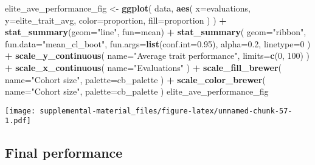 \documentclass[]{book}
\newenvironment{Shaded}{\begin{snugshade}}{\end{snugshade}}
\newcommand{\DataTypeTok}[1]{\textcolor[rgb]{0.13,0.29,0.53}{#1}}
\newcommand{\DecValTok}[1]{\textcolor[rgb]{0.00,0.00,0.81}{#1}}
\newcommand{\FloatTok}[1]{\textcolor[rgb]{0.00,0.00,0.81}{#1}}
\newcommand{\KeywordTok}[1]{\textcolor[rgb]{0.13,0.29,0.53}{\textbf{#1}}}
\newcommand{\NormalTok}[1]{#1}
\newcommand{\OperatorTok}[1]{\textcolor[rgb]{0.81,0.36,0.00}{\textbf{#1}}}
\newcommand{\StringTok}[1]{\textcolor[rgb]{0.31,0.60,0.02}{#1}}
\begin{document}
\begin{Shaded}
\begin{Highlighting}[]
\NormalTok{elite_ave_performance_fig <-}
\StringTok{  }\KeywordTok{ggplot}\NormalTok{(}
\NormalTok{    data,}
    \KeywordTok{aes}\NormalTok{(}
      \DataTypeTok{x=}\NormalTok{evaluations,}
      \DataTypeTok{y=}\NormalTok{elite_trait_avg,}
      \DataTypeTok{color=}\NormalTok{proportion,}
      \DataTypeTok{fill=}\NormalTok{proportion}
\NormalTok{    )}
\NormalTok{  ) }\OperatorTok{+}
\StringTok{  }\KeywordTok{stat_summary}\NormalTok{(}\DataTypeTok{geom=}\StringTok{"line"}\NormalTok{, }\DataTypeTok{fun=}\NormalTok{mean) }\OperatorTok{+}
\StringTok{  }\KeywordTok{stat_summary}\NormalTok{(}
    \DataTypeTok{geom=}\StringTok{"ribbon"}\NormalTok{,}
    \DataTypeTok{fun.data=}\StringTok{"mean_cl_boot"}\NormalTok{,}
    \DataTypeTok{fun.args=}\KeywordTok{list}\NormalTok{(}\DataTypeTok{conf.int=}\FloatTok{0.95}\NormalTok{),}
    \DataTypeTok{alpha=}\FloatTok{0.2}\NormalTok{,}
    \DataTypeTok{linetype=}\DecValTok{0}
\NormalTok{  ) }\OperatorTok{+}
\StringTok{  }\KeywordTok{scale_y_continuous}\NormalTok{(}
    \DataTypeTok{name=}\StringTok{"Average trait performance"}\NormalTok{,}
    \DataTypeTok{limits=}\KeywordTok{c}\NormalTok{(}\DecValTok{0}\NormalTok{, }\DecValTok{100}\NormalTok{)}
\NormalTok{  ) }\OperatorTok{+}
\StringTok{  }\KeywordTok{scale_x_continuous}\NormalTok{(}
    \DataTypeTok{name=}\StringTok{"Evaluations"}
\NormalTok{  ) }\OperatorTok{+}
\StringTok{  }\KeywordTok{scale_fill_brewer}\NormalTok{(}
    \DataTypeTok{name=}\StringTok{"Cohort size"}\NormalTok{,}
    \DataTypeTok{palette=}\NormalTok{cb_palette}
\NormalTok{  ) }\OperatorTok{+}
\StringTok{  }\KeywordTok{scale_color_brewer}\NormalTok{(}
    \DataTypeTok{name=}\StringTok{"Cohort size"}\NormalTok{,}
    \DataTypeTok{palette=}\NormalTok{cb_palette}
\NormalTok{  )}
\NormalTok{elite_ave_performance_fig}
\end{Highlighting}
\end{Shaded}

\texttt{[image: supplemental-material\_files/figure-latex/unnamed-chunk-57-1.pdf]}

\hypertarget{final-performance-5}{%
\subsection{Final performance}\label{final-performance-5}}
\end{document}
